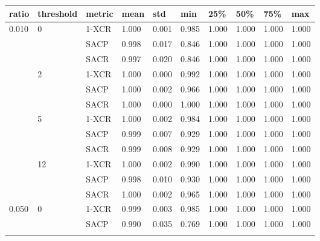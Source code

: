 \begin{longtable}[c]{|l|l|l|l|l|l|l|l|l|l|}
\hline
ratio                   & threshold           & metric & mean  & std   & min   & 25\%  & 50\%  & 75\%  & max   \\ \hline
\endhead
%
\multirow{12}{*}{0.010} & \multirow{3}{*}{0}  & 1-XCR  & 1.000 & 0.001 & 0.985 & 1.000 & 1.000 & 1.000 & 1.000 \\ \cline{3-10} 
                        &                     & SACP   & 0.998 & 0.017 & 0.846 & 1.000 & 1.000 & 1.000 & 1.000 \\ \cline{3-10} 
                        &                     & SACR   & 0.997 & 0.020 & 0.846 & 1.000 & 1.000 & 1.000 & 1.000 \\ \cline{2-10} 
                        & \multirow{3}{*}{2}  & 1-XCR  & 1.000 & 0.000 & 0.992 & 1.000 & 1.000 & 1.000 & 1.000 \\ \cline{3-10} 
                        &                     & SACP   & 1.000 & 0.002 & 0.966 & 1.000 & 1.000 & 1.000 & 1.000 \\ \cline{3-10} 
                        &                     & SACR   & 1.000 & 0.000 & 1.000 & 1.000 & 1.000 & 1.000 & 1.000 \\ \cline{2-10} 
                        & \multirow{3}{*}{5}  & 1-XCR  & 1.000 & 0.002 & 0.984 & 1.000 & 1.000 & 1.000 & 1.000 \\ \cline{3-10} 
                        &                     & SACP   & 0.999 & 0.007 & 0.929 & 1.000 & 1.000 & 1.000 & 1.000 \\ \cline{3-10} 
                        &                     & SACR   & 0.999 & 0.008 & 0.929 & 1.000 & 1.000 & 1.000 & 1.000 \\ \cline{2-10} 
                        & \multirow{3}{*}{12} & 1-XCR  & 1.000 & 0.002 & 0.990 & 1.000 & 1.000 & 1.000 & 1.000 \\ \cline{3-10} 
                        &                     & SACP   & 0.998 & 0.010 & 0.930 & 1.000 & 1.000 & 1.000 & 1.000 \\ \cline{3-10} 
                        &                     & SACR   & 1.000 & 0.002 & 0.965 & 1.000 & 1.000 & 1.000 & 1.000 \\ \hline
\multirow{12}{*}{0.050} & \multirow{3}{*}{0}  & 1-XCR  & 0.999 & 0.003 & 0.985 & 1.000 & 1.000 & 1.000 & 1.000 \\ \cline{3-10} 
                        &                     & SACP   & 0.990 & 0.035 & 0.769 & 1.000 & 1.000 & 1.000 & 1.000 \\ \cline{3-10} 

\end{longtable}
